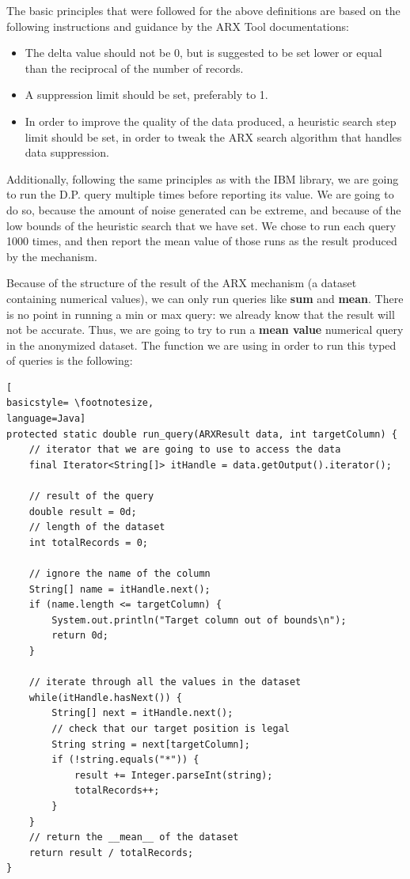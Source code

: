 The basic principles that were followed for the above definitions are based on the following instructions and guidance by the ARX Tool documentations:
\begin{itemize}
    \item The delta value should not be 0, but is suggested to be set lower or equal than the reciprocal of the number of records.
    \item A suppression limit should be set, preferably to 1.
    \item In order to improve the quality of the data produced, a heuristic search step limit should be set, in order to tweak the ARX search algorithm that handles data suppression.
\end{itemize}

Additionally, following the same principles as with the IBM library, we are going to run the D.P. query multiple times before reporting its value. We are going to do so, because the amount of noise generated can be extreme, and because of the low bounds of the heuristic search that we have set. We chose to run each query 1000 times, and then report the mean value of those runs as the result produced by the mechanism.

Because of the structure of the result of the ARX mechanism (a dataset containing numerical values), we can only run queries like \textbf{sum} and \textbf{mean}. There is no point in running a min or max query: we already know that the result will not be accurate. Thus, we are going to try to run a\textbf{ mean value} numerical query in the anonymized dataset. The function we are using in order to run this typed of queries is the following:
\bigskip
\clearpage
\begin{lstlisting}[
basicstyle= \footnotesize,
language=Java]
protected static double run_query(ARXResult data, int targetColumn) {
	// iterator that we are going to use to access the data
	final Iterator<String[]> itHandle = data.getOutput().iterator();
	
	// result of the query
	double result = 0d;
	// length of the dataset
	int totalRecords = 0;
	
	// ignore the name of the column
	String[] name = itHandle.next();
	if (name.length <= targetColumn) {
		System.out.println("Target column out of bounds\n");
		return 0d;
	}

	// iterate through all the values in the dataset
	while(itHandle.hasNext()) {
		String[] next = itHandle.next();
		// check that our target position is legal
		String string = next[targetColumn];
		if (!string.equals("*")) {
			result += Integer.parseInt(string);		
			totalRecords++;				
		}
	}
    // return the __mean__ of the dataset
    return result / totalRecords;
}
	
\end{lstlisting}
\bigskip

